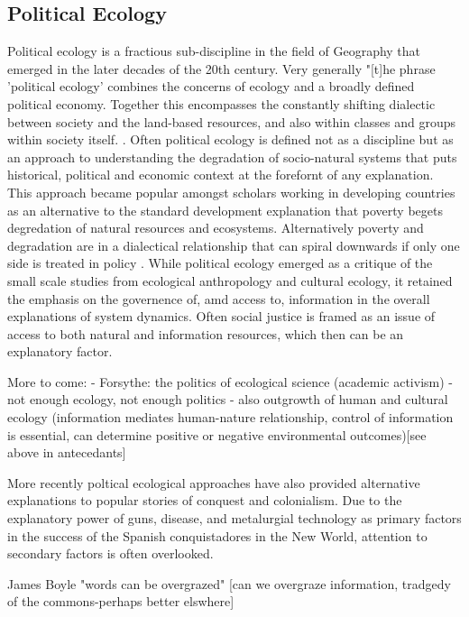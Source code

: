 \subsection{Political Ecology}

Political ecology is a fractious sub-discipline in the field of Geography that emerged in the later decades of the 20th century. Very generally "[t]he phrase 'political ecology' combines the concerns of ecology and a broadly defined political economy. Together this encompasses the constantly shifting dialectic between society and the land-based resources, and also within classes and groups within society itself. \citep[][p. 17]{blaikie_1987}. Often political ecology is defined not as a discipline but as an approach to understanding the degradation of socio-natural systems that puts historical, political and economic context at the forefornt of any explanation. This approach became popular amongst scholars working in developing countries as an alternative to the standard development explanation that poverty begets degredation of natural resources and ecosystems. Alternatively poverty and degradation are in a dialectical relationship that can spiral downwards if only one side is treated in policy \citep{blaikie_1987, peet_1996}. While political ecology emerged as a critique of the small scale studies from ecological anthropology and cultural ecology, it retained the emphasis on the governence of, amd access to, information in the overall explanations of system dynamics. Often social justice is framed as an issue of access to both natural and information resources, which then can be an explanatory factor.

More to come:
- Forsythe: the politics of ecological science (academic activism) \citep{forsyth_2003,huxley_1974}
- not enough ecology, not enough politics \citep{walker_2005,walker_2007}
- also outgrowth of human and cultural ecology (information mediates human-nature relationship, control of information is essential, can determine positive or negative environmental outcomes)[see above in antecedants]

More recently poltical ecological approaches have also provided alternative explanations to popular stories of conquest and colonialism. Due to the explanatory power of guns, disease, and metalurgial technology as primary factors in the success of the Spanish conquistadores in the New World, attention to secondary factors is often overlooked. 

James Boyle "words can be overgrazed" [can we overgraze information, tradgedy of the commons-perhaps better elswhere]
